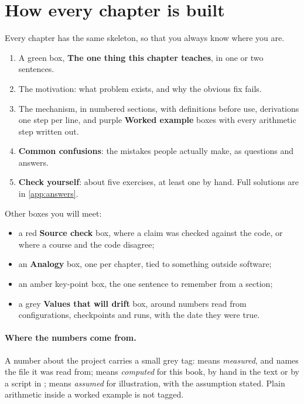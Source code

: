 \section*{How every chapter is built}

Every chapter has the same skeleton, so that you always know where you are.
\begin{enumerate}
  \item A green box, \textbf{The one thing this chapter teaches}, in one or two sentences.
  \item The motivation: what problem exists, and why the obvious fix fails.
  \item The mechanism, in numbered sections, with definitions before use, derivations one step
    per line, and purple \textbf{Worked example} boxes with every arithmetic step written out.
  \item \textbf{Common confusions}: the mistakes people actually make, as questions and answers.
  \item \textbf{Check yourself}: about five exercises, at least one by hand. Full solutions are in
    \cref{app:answers}.
\end{enumerate}
Other boxes you will meet:
\begin{itemize}
  \item a red \textbf{Source check} box, where a claim was checked against the code, or where a course
    and the code disagree;
  \item an \textbf{Analogy} box, one per chapter, tied to something outside software;
  \item an amber key-point box, the one sentence to remember from a section;
  \item a grey \textbf{Values that will drift} box, around numbers read from configurations,
    checkpoints and runs, with the date they were true.
\end{itemize}

\paragraph{Where the numbers come from.} A number about the project carries a small grey tag:
 means \emph{measured}, and names the file it was read from; \tagC{} means
\emph{computed} for this book, by hand in the text or by a script in ;
\tagA{} means \emph{assumed} for illustration, with the assumption stated. Plain arithmetic inside a
worked example is not tagged.

